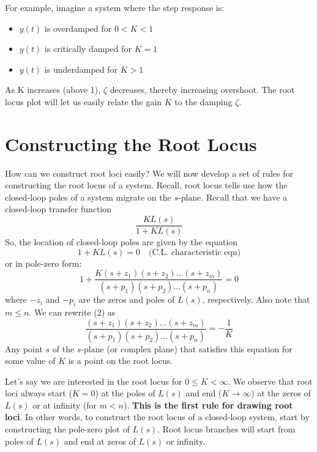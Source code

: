 \documentclass{book}
\newcommand{\spl}{s\textrm{-plane}}
\begin{document}
	For example, imagine a system where the step response is:
	\begin{itemize}
		\item $ y(t) $ is overdamped for $ 0 < K < 1 $
		\item $ y(t) $ is critically damped for $ K=1 $
		\item $ y(t) $ is underdamped for $ K>1 $
	\end{itemize}
	As K increases (above 1), $ \zeta $ decreases, thereby increasing overshoot. The root locus plot will let us easily relate the gain $ K $ to the damping $ \zeta $.
	
	\section*{Constructing the Root Locus}
	How can we construct root loci easily? We will now develop a set of rules for constructing the root locus of a system. Recall, root locus tells use how the closed-loop poles of a system migrate on the $ \spl $. Recall that we have a closed-loop transfer function
	\[ \frac{KL(s)}{1+KL(s)} \] 
	So, the location of closed-loop poles are given by the equation
	\begin{equation}
	1+KL(s) = 0 \quad\textrm{(C.L. characteristic eqn)}
	\end{equation}
	or in pole-zero form:
	\begin{equation}
	1+\frac{K(s+z_1)(s+z_2)\ldots(s+z_m)}{(s+p_1)(s+p_2)\ldots(s+p_n)} = 0
	\end{equation}
	where $ -z_i $ and $ -p_i $ are the zeros and poles of $ L(s) $, respectively. Also note that $ m\leq n $. 	We can rewrite (2) as
	\begin{equation}
	\frac{(s+z_1)(s+z_2)\ldots(s+z_m)}{(s+p_1)(s+p_2)\ldots(s+p_n)} = -\frac{1}{K}
	\end{equation}
	Any point $ s $ of the $ \spl $ (or complex plane) that satisfies this equation for some value of $ K $ is a point on the root locus.
	
	Let's say we are interested in the root locus for $ 0\leq K < \infty $. We observe that root loci always start ($ K=0 $) at the poles of $ L(s) $ and end ($ K\to\infty $) at the zeros of $ L(s) $ or at infinity (for $ m<n $). \textbf{This is the first rule for drawing root loci}. In other words, to construct the root locus of a closed-loop system, start by constructing the pole-zero plot of $ L(s) $. Root locus branches will start from poles of $ L(s) $ and end at zeros of $ L(s) $ or infinity.
	
\end{document}
